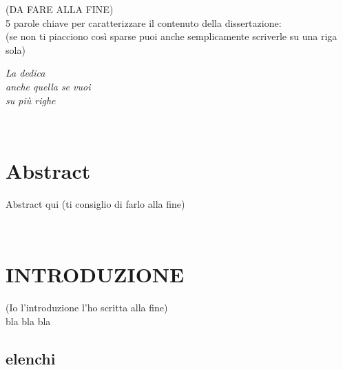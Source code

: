\documentclass[12pt,a4paper,twoside]{book}
\begin{document}
\restoregeometry
\newpage
\begin{center}
    (DA FARE ALLA FINE)\\
    5 parole chiave per caratterizzare il contenuto della dissertazione:\\ (se non ti piacciono così sparse puoi anche semplicamente scriverle su una riga sola)
\end{center}

\newpage

\topmargin=6.5cm
\begin{flushright}
\emph{
\LARGE{La dedica}\\\vspace{2mm}
\LARGE{anche quella se vuoi}\\\vspace{3mm}
\LARGE{su più righe}
}
\end{flushright}
\newpage~\newpage
{}
\chapter*{Abstract}
Abstract qui (ti consiglio di farlo alla fine)

\topmargin=-1cm
\tableofcontents
\thispagestyle{empty}
\listoftables
\thispagestyle{empty}
\listoffigures
\thispagestyle{empty}
\newpage~\newpage


\setcounter{chapter}{-1}
\raggedbottom
\chapter{INTRODUZIONE} \label{chap:intro}
\pagestyle{plain}
\setcounter{page}{1}

(Io l'introduzione l'ho scritta alla fine)\\
bla bla bla
\section{elenchi}
\end{document}
